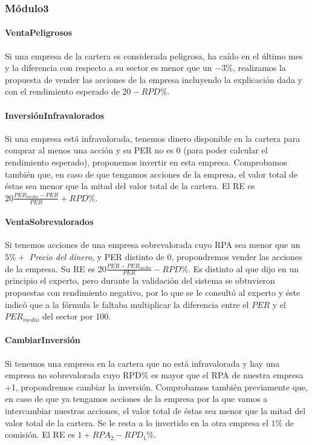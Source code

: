 \documentclass[11pt,leqno]{article}
\theoremstyle{definition_wo_parentheses}
\theoremstyle{plain}
\theoremstyle{remark}
\begin{document}
\subsubsection{Módulo3} 

\paragraph{VentaPeligrosos} Si una empresa de la cartera es considerada peligrosa, ha caído en el último mes y la diferencia con respecto a su sector es menor que un $-3\%$, realizamos la propuesta de vender las acciones de la empresa incluyendo la explicación dada y con el rendimiento esperado de $20 - RPD\%$.

\paragraph{InversiónInfravalorados} Si una empresa está infravalorada, tenemos dinero disponible en la cartera para comprar al menos una acción y su PER no es 0 (para poder calcular el rendimiento esperado), proponemos invertir en esta empresa. Comprobamos también que, en caso de que tengamos acciones de la empresa, el valor total de éstas sea menor que la mitad del valor total de la cartera. El RE es $ 20 \frac{PER_{medio} - PER}{PER} + RPD\%$.

\paragraph{VentaSobrevalorados} Si tenemos acciones de una empresa sobrevalorada cuyo RPA sea menor que un $5\% + $ \textit{Precio del dinero}, y PER distinto de 0, propondremos vender las acciones de la empresa. Su RE es  $ 20 \frac{PER - PER_{medio}}{PER} - RPD\%$. Es distinto al que dijo en un principio el experto, pero durante la validación del sistema se obtuvieron propuestas con rendimiento negativo, por lo que se le consultó al experto y éste indicó que a la fórmula le faltaba multiplicar la diferencia entre el $PER$ y el $PER_{medio}$ del sector por 100. 

\paragraph{CambiarInversión} Si tenemos una empresa en la cartera que no está infravalorada y hay una empresa no sobrevalorada cuyo RPD$\%$ es mayor que el RPA de nuestra empresa +1, propondremos cambiar la inversión. Comprobamos también previamente que, en caso de que ya  tengamos acciones de la empresa por la que vamos a intercambiar nuestras acciones, el valor total de éstas sea menor que la mitad del valor total de la cartera. Se le resta a lo invertido en la otra empresa el $1\%$ de comisión. El RE es $1+RPA_2-RPD_1\%$.
\end{document}
